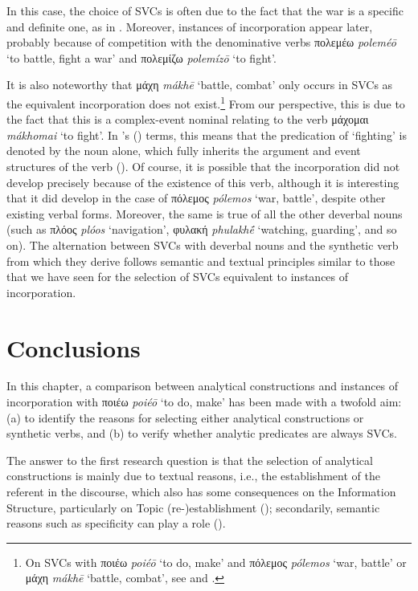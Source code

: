 \documentclass[output=paper,colorlinks,citecolor=brown]{langscibook}
\begin{document}
In this case, the choice of SVCs is often due to the fact that the war is a specific and definite one, as in . Moreover, instances of incorporation appear later, probably because of competition with the denominative verbs πολεμέω \textit{poleméō} `to battle, fight a war' and πολεμίζω \textit{polemízō} `to fight'.

It is also noteworthy that μάχη \textit{mákhē} `battle, combat' only occurs in SVCs as the equivalent incorporation does not exist.\footnote{On SVCs with ποιέω \textit{poiéō} `to do, make' and πόλεμος \textit{pólemos} `war, battle' or μάχη \textit{mákhē} `battle, combat', see \citet{JiménezLópez2012,Jimenez2016} and \citet{Banos2015}.} From our perspective, this is due to the fact that this is a complex-event nominal relating to the verb μάχομαι \textit{mákhomai} `to fight'. In \citeauthor{Grimshaw1990}'s (\citeyear{Grimshaw1990}) terms, this means that the predication of `fighting' is denoted by the noun alone, which fully inherits the argument and event structures of the verb (). Of course, it is possible that the incorporation did not develop precisely because of the existence of this verb, although it is interesting that it did develop in the case of πόλεμος \textit{pólemos} `war, battle', despite other existing verbal forms. Moreover, the same is true of all the other deverbal nouns (such as πλόος \textit{plóos} `navigation', φυλακή \textit{phulakhḗ} `watching, guarding', and so on). The alternation between SVCs with deverbal nouns and the synthetic verb from which they derive follows semantic and textual principles \citep{Tambasco2021} similar to those that we have seen for the selection of SVCs equivalent to instances of incorporation.

\section{Conclusions}\label{Section4}

In this chapter, a comparison between analytical constructions and instances of incorporation with ποιέω \textit{poiéō} `to do, make' has been made with a twofold aim: (a) to identify the reasons for selecting either analytical constructions or synthetic verbs, and (b) to verify whether analytic predicates are always SVCs.

The answer to the first research question is that the selection of analytical constructions is mainly due to textual reasons, i.e., the establishment of the referent in the discourse, which also has some consequences on the Information Structure, particularly on Topic (re-)establishment (); secondarily, semantic reasons such as specificity can play a role ().
\end{document}
